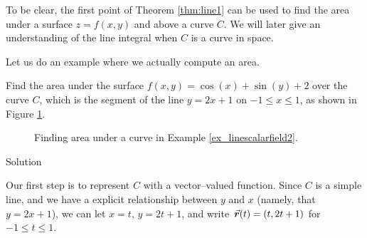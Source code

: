 To be clear, the first point of Theorem \ref{thm:line1} can be used to find the area under a surface $z=f(x,y)$ and above a curve $C$. We will later give an understanding of the line integral when $C$ is a curve in space.

Let us do an example where we actually compute an area.

\begin{example}\label{ex_linescalarfield2}
Find the area under the surface $f(x,y) =\cos(x)+\sin(y)+2$ over the curve $C$, which is the segment of the line $y=2x+1$ on $-1\leq x\leq 1$, as shown in Figure \ref{fig_double_22}.

\begin{figure}[H]
\centering
\qquad
{}
\caption{Finding area under a curve in Example \ref{ex_linescalarfield2}.}
\label{fig_double_22}
\end{figure}

\pagebreak
{}Solution 

Our first step is to represent $C$ with a vector--valued function. Since $C$ is a simple line, and we have a explicit relationship between $y$ and $x$ (namely, that $y=2x+1$), we can let $x = t$, $y = 2t+1$, and write $\vrt = \left( t, 2t+1\right)$ for $-1\leq t\leq 1$. 


\end{example}
